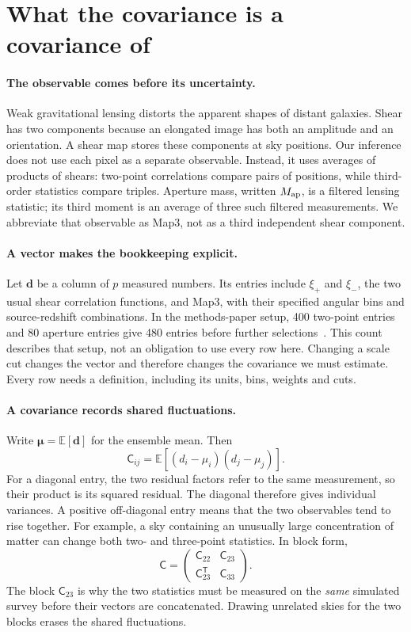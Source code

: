 \documentclass[11pt]{article}
\newcommand{\Cov}{\mathsf{C}}
\newcommand{\T}{^{\mathsf{T}}}
\newcommand{\E}{\mathbb{E}}
\begin{document}
\section{What the covariance is a covariance of}
\paragraph{The observable comes before its uncertainty.}
Weak gravitational lensing distorts the apparent shapes of distant galaxies.
Shear has two components because an elongated image has both an amplitude
and an orientation. A shear map stores these components at sky positions.
Our inference does not use each pixel as a separate observable. Instead, it
uses averages of products of shears: two-point correlations compare pairs
of positions, while third-order statistics compare triples. Aperture mass,
written $M_{\rm ap}$, is a filtered lensing statistic; its third moment is an
average of three such filtered measurements. We abbreviate that observable
as Map3, not as a third independent shear component.

\paragraph{A vector makes the bookkeeping explicit.}
Let $\boldsymbol d$ be a column of $p$ measured numbers. Its entries include
$\xi_+$ and $\xi_-$, the two usual shear correlation functions, and Map3,
with their specified angular bins and source-redshift combinations. In
the methods-paper setup, 400 two-point entries and 80 aperture entries give
480 entries before further selections~\cite{gomes}. This count describes that
setup, not an obligation to use every row here. Changing a scale cut changes
the vector and therefore changes the covariance we must estimate.
Every row needs a definition, including its units, bins, weights and cuts.

\paragraph{A covariance records shared fluctuations.}
Write $\boldsymbol\mu=\E[\boldsymbol d]$ for the ensemble mean. Then
\begin{equation}
 \Cov_{ij}=\E[(d_i-\mu_i)(d_j-\mu_j)].
\end{equation}
For a diagonal entry, the two residual factors refer to the same
measurement, so their product is its squared residual. The diagonal
therefore gives individual variances. A positive off-diagonal entry means
that the two observables tend to rise together. For example, a sky containing
an unusually large concentration of matter can change both two- and
three-point statistics. In block form,
\begin{equation}
 \Cov=\begin{pmatrix}\Cov_{22}&\Cov_{23}\\
                     \Cov_{23}\T&\Cov_{33}\end{pmatrix}.
\end{equation}
The block $\Cov_{23}$ is why the two statistics must be measured on the
\emph{same} simulated survey before their vectors are concatenated. Drawing
unrelated skies for the two blocks erases the shared fluctuations.
\end{document}
